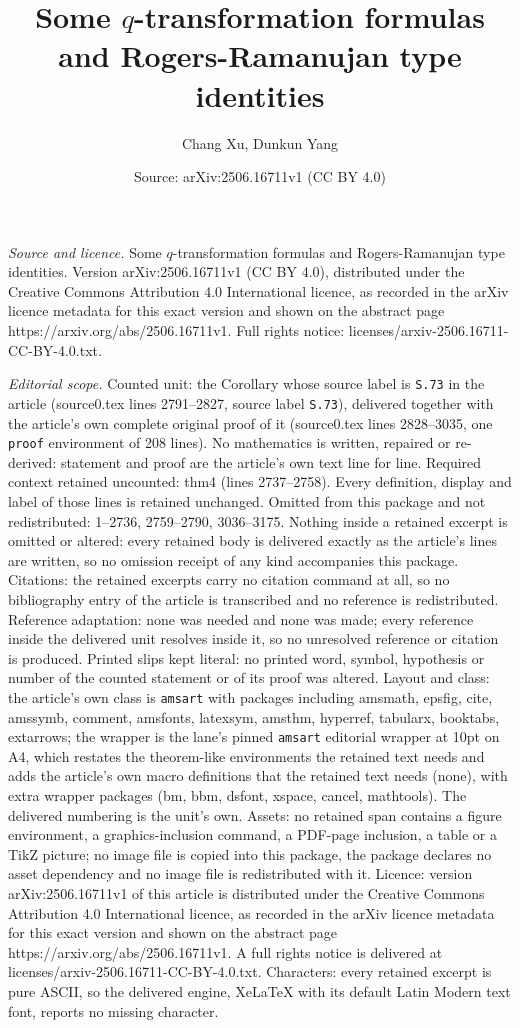\documentclass[10pt,a4paper]{amsart}
\title[Some $q$-transformation formulas and Rogers-Ramanujan type i]{Some $q$-transformation formulas and Rogers-Ramanujan type identities}
\author{Chang Xu, Dunkun Yang}
\date{Source: arXiv:2506.16711v1 (CC BY 4.0)}
\begin{document}
\maketitle

\noindent\emph{Source and licence.} Some $q$-transformation formulas and Rogers-Ramanujan type identities. Version arXiv:2506.16711v1 (CC BY 4.0), distributed under the Creative Commons Attribution 4.0 International licence, as recorded in the arXiv licence metadata for this exact version and shown on the abstract page https://arxiv.org/abs/2506.16711v1. Full rights notice: licenses/arxiv-2506.16711-CC-BY-4.0.txt.\par\smallskip

\noindent\textit{Editorial scope.} Counted unit: the Corollary whose source label is \texttt{S.73} in the article (source0.tex lines 2791--2827, source label \texttt{S.73}), delivered together with the article's own complete original proof of it (source0.tex lines 2828--3035, one \texttt{proof} environment of 208 lines). No mathematics is written, repaired or re-derived: statement and proof are the article's own text line for line. Required context retained uncounted: thm4 (lines 2737--2758). Every definition, display and label of those lines is retained unchanged. Omitted from this package and not redistributed: 1--2736, 2759--2790, 3036--3175. Nothing inside a retained excerpt is omitted or altered: every retained body is delivered exactly as the article's lines are written, so no omission receipt of any kind accompanies this package. Citations: the retained excerpts carry no citation command at all, so no bibliography entry of the article is transcribed and no reference is redistributed. Reference adaptation: none was needed and none was made; every reference inside the delivered unit resolves inside it, so no unresolved reference or citation is produced. Printed slips kept literal: no printed word, symbol, hypothesis or number of the counted statement or of its proof was altered. Layout and class: the article's own class is \texttt{amsart} with packages including amsmath, epsfig, cite, amssymb, comment, amsfonts, latexsym, amsthm, hyperref, tabularx, booktabs, extarrows; the wrapper is the lane's pinned \texttt{amsart} editorial wrapper at 10pt on A4, which restates the theorem-like environments the retained text needs and adds the article's own macro definitions that the retained text needs (none), with extra wrapper packages (bm, bbm, dsfont, xspace, cancel, mathtools). The delivered numbering is the unit's own. Assets: no retained span contains a figure environment, a graphics-inclusion command, a PDF-page inclusion, a table or a TikZ picture; no image file is copied into this package, the package declares no asset dependency and no image file is redistributed with it. Licence: version arXiv:2506.16711v1 of this article is distributed under the Creative Commons Attribution 4.0 International licence, as recorded in the arXiv licence metadata for this exact version and shown on the abstract page https://arxiv.org/abs/2506.16711v1. A full rights notice is delivered at licenses/arxiv-2506.16711-CC-BY-4.0.txt. Characters: every retained excerpt is pure ASCII, so the delivered engine, XeLaTeX with its default Latin Modern text font, reports no missing character.
\end{document}

